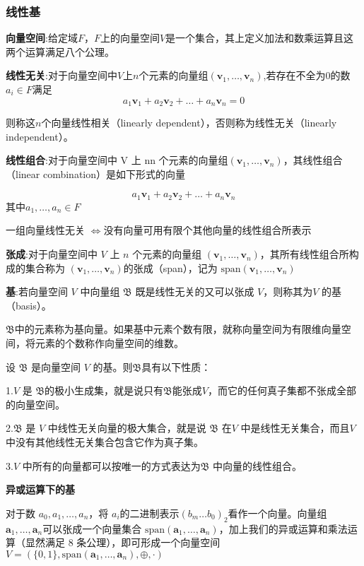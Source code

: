 \documentclass[UTF8]{ctexart}
\begin{document}
\subsubsection{线性基}

\textbf{向量空间}:给定域$F$，$F$上的向量空间$V$是一个集合，其上定义加法和数乘运算且这两个运算满足八个公理。

\textbf{线性无关}:对于向量空间中$V$上$n$个元素的向量组$(\mathbf{v}_1, \ldots, \mathbf{v}_n)$,若存在不全为$0$的数$a_i \in F$满足
$$
a_{1}\mathbf{v}_{1}+a_{2}\mathbf {v}_{2}+\ldots +a_{n}\mathbf{v}_{n} = 0
$$

则称这$n$个向量线性相关（linearly dependent），否则称为线性无关（linearly independent）。

\textbf{线性组合}:对于向量空间中 V 上 nn 个元素的向量组$(\mathbf{v}_1, \ldots, \mathbf{v}_n)$，其线性组合（linear combination）是如下形式的向量

$$
a_{1}\mathbf{v}_{1} + a_{2}\mathbf {v} _{2}+\ldots +a_{n}\mathbf {v} _{n}
$$
​​ 
其中$a_1, \ldots, a_n \in F$

一组向量线性无关 $\Leftrightarrow$没有向量可用有限个其他向量的线性组合所表示

\textbf{张成}:对于向量空间中 $V$ 上 $n$ 个元素的向量组 $(\mathbf{v}_1, \ldots, \mathbf{v}_n)$，其所有线性组合所构成的集合称为 $(\mathbf{v}_1, \ldots, \mathbf{v}_n)$的张成（span），记为 $\mathrm{span}(\mathbf{v}_1, \ldots, \mathbf{v}_n)$

\textbf{基}:若向量空间 $V$ 中向量组 $\mathfrak{B}$ 既是线性无关的又可以张成 $V$，则称其为$V$ 的基（basis）。

$\mathfrak{B}$中的元素称为基向量。如果基中元素个数有限，就称向量空间为有限维向量空间，将元素的个数称作向量空间的维数。

设 $\mathfrak {B}$ 是向量空间 $V$ 的基。则$\mathfrak {B}$具有以下性质：

1.$V$ 是 $\mathfrak {B}$的极小生成集，就是说只有$\mathfrak {B}$能张成$V$，而它的任何真子集都不张成全部的向量空间。

2.$\mathfrak {B}$ 是 $V$ 中线性无关向量的极大集合，就是说 $\mathfrak {B}$ 在$V$ 中是线性无关集合，而且$V$ 中没有其他线性无关集合包含它作为真子集。

3.$V$ 中所有的向量都可以按唯一的方式表达为$\mathfrak {B}$ 中向量的线性组合。

\textbf{异或运算下的基}

对于数 $a_0, a_1, \ldots, a_n$，将 $a_i$的二进制表示$ (b_{m}\ldots b_0)_2$​ 看作一个向量。向量组 $\mathbf{a}_1, \ldots, \mathbf{a}_n$可以张成一个向量集合 $\mathrm{span}(\mathbf{a}_1, \ldots, \mathbf{a}_n)$，加上我们的异或运算和乘法运算（显然满足 8 条公理），即可形成一个向量空间 $V = (\{0, 1\}, \mathrm{span}(\mathbf{a}_1, \ldots, \mathbf{a}_n), \oplus, \cdot)$
\end{document}
